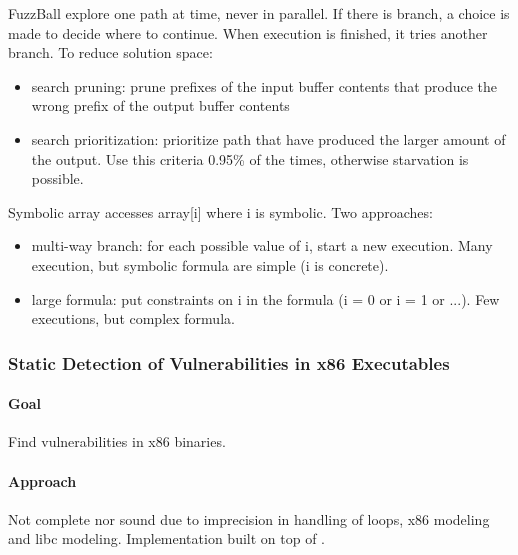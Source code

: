 FuzzBall explore one path at time, never in parallel. If there is branch, a choice is made to decide where to continue. When execution is finished, it tries another branch. To reduce solution space:
\begin{itemize}
  \item search pruning: prune prefixes of the input buffer contents that produce the wrong prefix of the output buffer contents
  \item search prioritization: prioritize path that have produced the larger amount of the output. Use this criteria 0.95\% of the times, otherwise starvation is possible.
\end{itemize}

Symbolic array accesses array[i] where i is symbolic. Two approaches:
\begin{itemize}
  \item multi-way branch: for each possible value of i, start a new execution. Many execution, but symbolic formula are simple (i is concrete).
  \item large formula: put constraints on i in the formula (i = 0 or i = 1 or ...). Few executions, but complex formula.
\end{itemize}

\subsubsection{\cite{CFB-ACSAC06} Static Detection of Vulnerabilities in x86 Executables} 

\paragraph{Goal}
Find vulnerabilities in x86 binaries.

\paragraph{Approach}
Not complete nor sound due to imprecision in handling of loops, x86 modeling and libc modeling.
Implementation built on top of \cite{KKM-USEC05}.

